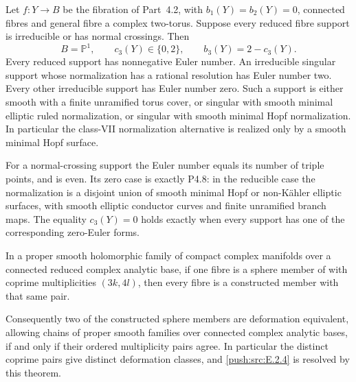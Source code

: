 \begin{proposition}[P4.58]\label{night:P4.58}\label{stmt:P4.58}

Let $f:Y\to B$ be the fibration of Part~4.2, with
$b_1(Y)=b_2(Y)=0$, connected fibres and general fibre a
complex two-torus. Suppose every reduced fibre support
is irreducible or has normal crossings. Then
\[
 B=\mathbb P^1,\qquad c_3(Y)\in\{0,2\},
                       \qquad b_3(Y)=2-c_3(Y).
\]
Every reduced support has nonnegative Euler number.
An irreducible singular support whose normalization has
a rational resolution has Euler number two. Every other
irreducible support has Euler number zero. Such a support
is either smooth with a finite unramified torus cover,
or singular with smooth minimal elliptic ruled
normalization, or singular with smooth minimal Hopf
normalization. In particular the class-VII normalization
alternative is realized only by a smooth minimal Hopf
surface.

For a normal-crossing support the Euler number equals
its number of triple points, and is even. Its zero case
is exactly P4.8: in the reducible case the normalization
is a disjoint union of smooth minimal Hopf or non-K\"ahler
elliptic surfaces, with smooth elliptic conductor curves
and finite unramified branch maps. The equality
$c_3(Y)=0$ holds exactly when every support has one of
the corresponding zero-Euler forms.
\end{proposition}

\begin{theorem}\label{push:src:E.2.23}

In a proper smooth holomorphic family of compact complex
manifolds over a connected reduced complex analytic base,
if one fibre is a sphere member of  with coprime
multiplicities $(3k,4l)$, then every fibre is a constructed
member with that same pair.

Consequently two of the constructed sphere members are
deformation equivalent, allowing chains of proper smooth
families over connected complex analytic bases, if and
only if their ordered multiplicity pairs agree.  In
particular the distinct coprime pairs give distinct
deformation classes, and \ref{push:src:E.2.4} is resolved by this theorem.
\end{theorem}

